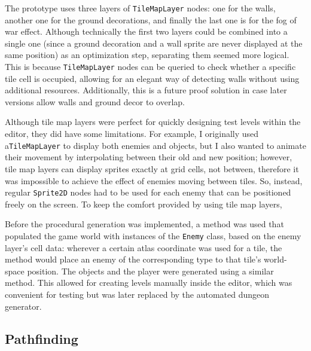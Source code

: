 The prototype uses three layers of \verb|TileMapLayer| nodes: one for the walls, another one for the ground decorations, and finally the last one is for the fog of war effect. Although technically the first two layers could be combined into a single one (since a ground decoration and a wall sprite are never displayed at the same position) as an optimization step, separating them seemed more logical. This is because \verb|TileMapLayer| nodes can be queried to check whether a specific tile cell is occupied, allowing for an elegant way of detecting walls without using additional resources. Additionally, this is a future proof solution in case later versions allow walls and ground decor to overlap.

Although tile map layers were perfect for quickly designing test levels within the editor, they did have some limitations. For example, I originally used a\verb|TileMapLayer| to display both enemies and objects, but I also wanted to animate their movement by interpolating between their old and new position; however, tile map layers can display sprites exactly at grid cells, not between, therefore it was impossible to achieve the effect of enemies moving between tiles. So, instead, regular \verb|Sprite2D| nodes had to be used for each enemy that can be positioned freely on the screen. To keep the comfort provided by using tile map layers, 

Before the procedural generation was implemented, a method was used that populated the game world with instances of the \verb|Enemy| class, based on the enemy layer's cell data: wherever a certain atlas coordinate was used for a tile, the method would place an enemy of the corresponding type to that tile's world-space position. The objects and the player were generated using a similar method. This allowed for creating levels manually inside the editor, which was convenient for testing but was later replaced by the automated dungeon generator.



\subsection{Pathfinding}

